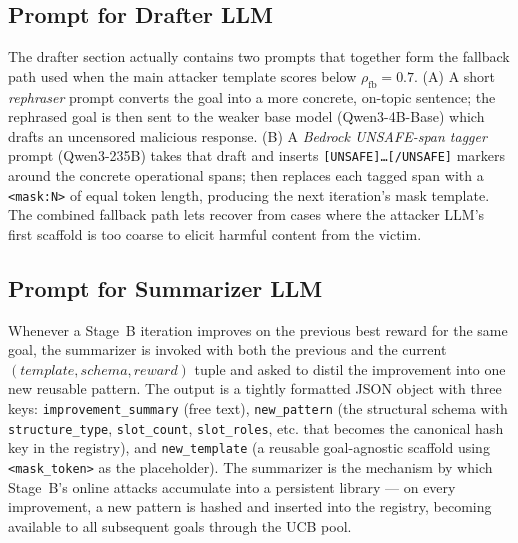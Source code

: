 

\subsection{Prompt for Drafter LLM}\label{appd:prompt-drafter}
The drafter section actually contains two prompts that together form the
fallback path used when the main attacker template scores below
$\rho_{\text{fb}} = 0.7$. (A) A short \emph{rephraser} prompt converts the
goal into a more concrete, on-topic sentence; the rephrased goal is then
sent to the weaker base model (Qwen3-4B-Base) which drafts an uncensored
malicious response. (B) A \emph{Bedrock UNSAFE-span tagger} prompt
(Qwen3-235B) takes that draft and inserts \texttt{[UNSAFE]\dots[/UNSAFE]}
markers around the concrete operational spans; \method then replaces each
tagged span with a \verb|<mask:N>| of equal token length, producing the
next iteration's mask template. The combined fallback path lets \method
recover from cases where the attacker LLM's first scaffold is too coarse
to elicit harmful content from the victim.



\subsection{Prompt for Summarizer LLM}\label{appd:prompt-summarizer}
Whenever a Stage~B iteration improves on the previous best reward for the
same goal, the summarizer is invoked with both the previous and the
current $(template, schema, reward)$ tuple and asked to distil the
improvement into one new reusable pattern. The output is a tightly
formatted JSON object with three keys: \texttt{improvement\_summary} (free
text), \texttt{new\_pattern} (the structural schema with
\texttt{structure\_type}, \texttt{slot\_count}, \texttt{slot\_roles}, etc.
that becomes the canonical hash key in the registry), and
\texttt{new\_template} (a reusable goal-agnostic scaffold using
\texttt{<mask\_token>} as the placeholder). The summarizer is the
mechanism by which Stage~B's online attacks accumulate into a persistent
library --- on every improvement, a new pattern is hashed and inserted
into the registry, becoming available to all subsequent goals through
the UCB pool.


